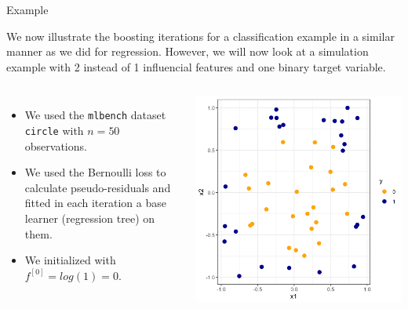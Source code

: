 \begin{vbframe}{Example}

We now illustrate the boosting iterations for a classification example in a similar manner as we did for regression.
However, we will now look at a simulation example with 2 instead of 1 influencial features and one binary target variable.

\begin{columns}
\column{5.5cm}
\begin{itemize}
\item We used the \texttt{mlbench} dataset \texttt{circle} with $n = 50$ observations.
\item We used the Bernoulli loss to calculate pseudo-residuals and fitted in each iteration a base learner (regression tree) on them.
\item We initialized with $f^{[0]} = log(1) = 0.$
\end{itemize}
\column{4.5cm}
\begin{center}
\includegraphics[width=\textwidth]{figure_man/boosting_classif_example.png}
\end{center}

\end{columns}



\end{vbframe}


